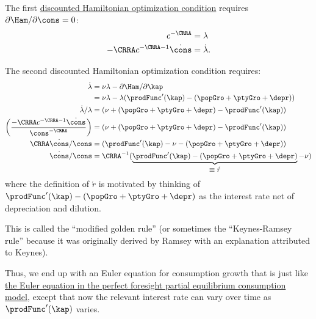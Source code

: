 \documentclass{handout}
\begin{document}
The first \href{https://en.wikipedia.org/wiki/Hamiltonian_(control_theory)}{discounted Hamiltonian optimization condition} requires $\partial 
\Ham/\partial \cons = 0$:
\begin{equation}\begin{gathered}\begin{aligned}
  c^{-\CRRA} & =  \lambda  \label{eq:H1A} \\
  -\CRRA c^{-\CRRA-1}\dot{\cons} & =  \dot{\lambda} 
                                       .
\end{aligned}\end{gathered}\end{equation}

The second discounted Hamiltonian optimization condition requires:
\begin{equation}\begin{gathered}\begin{aligned}
  \dot{\lambda} & =  \nu\lambda - \partial \Ham/\partial \kap  \\
                & =  \nu\lambda - \lambda (\prodFunc^{\prime}(\kap) - (\popGro+\ptyGro+\depr))  \\
  \dot{\lambda}/{\lambda} & =  (\nu+(\popGro+\ptyGro+\depr)-\prodFunc^{\prime}(\kap))
  \\  \left(\frac{-\CRRA c^{-\CRRA-1}\dot{\cons}}{\cons^{-\CRRA}}\right) & =  (\nu+(\popGro+\ptyGro+\depr)-\prodFunc^{\prime}(\kap))
  \\  \CRRA \dot{\cons}/\cons & =  (\prodFunc^{\prime}(\kap)-\nu-(\popGro+\ptyGro+\depr))
  \\  \dot{\cons}/\cons  & =  \CRRA^{-1}(\underbrace{\prodFunc^{\prime}(\kap)-(\popGro+\ptyGro+\depr)}_{\mbox{$\equiv \acute{r}$}}-\nu)
\end{aligned}\end{gathered}\end{equation}
where the definition of $\acute{r}$ is motivated by thinking of 
$\prodFunc^{\prime}(\kap)-(\popGro+\ptyGro+\depr)$ as the interest rate net of depreciation and
dilution.  

This is called the ``modified golden rule'' (or sometimes the 
``Keynes-Ramsey rule'' because it was originally derived by 
Ramsey with an explanation attributed to Keynes).  

Thus, we end up with an Euler equation for consumption growth that is
just like \href{http://www.econ2.jhu.edu/people/ccarroll/public/LectureNotes/Consumption/PerfForesightCRRA/#EulerCGroFac}{the Euler equation in the perfect foresight partial equilibrium consumption model}, except that now the relevant interest rate can vary over
time as $\prodFunc^{\prime}(\kap)$ varies.
\end{document}
